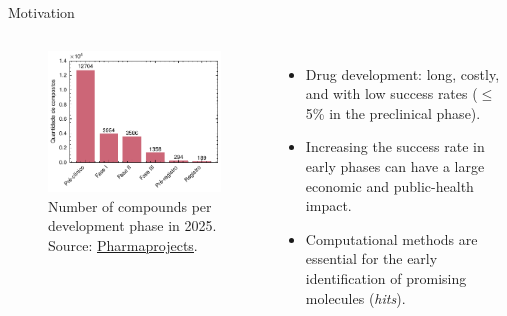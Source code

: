 \documentclass[aspectratio=169,xcolor=dvipsnames]{beamer}
\begin{document}
\begin{frame}{Motivation}
    \begin{columns}[c]

        \begin{figure}
            \centering
            \includegraphics[width=1\linewidth]{imgs/pipeline-sizes.pdf}
            \caption{Number of compounds per development phase in 2025. Source: {\color{blue} \underline{\href{https://www.citeline.com/-/media/C28F0B5022334A4EAC9B0DDDE55F5737}{Pharmaprojects}}.}}
        \end{figure}

        \begin{itemize}
            \item Drug development: long, costly, and with low success rates ($\leq$ 5\% in the preclinical phase).
            \item Increasing the success rate in early phases can have a large economic and public-health impact.
            \item Computational methods are essential for the early identification of promising molecules (\textit{hits}).
        \end{itemize}
    \end{columns}
\end{frame}
\end{document}

